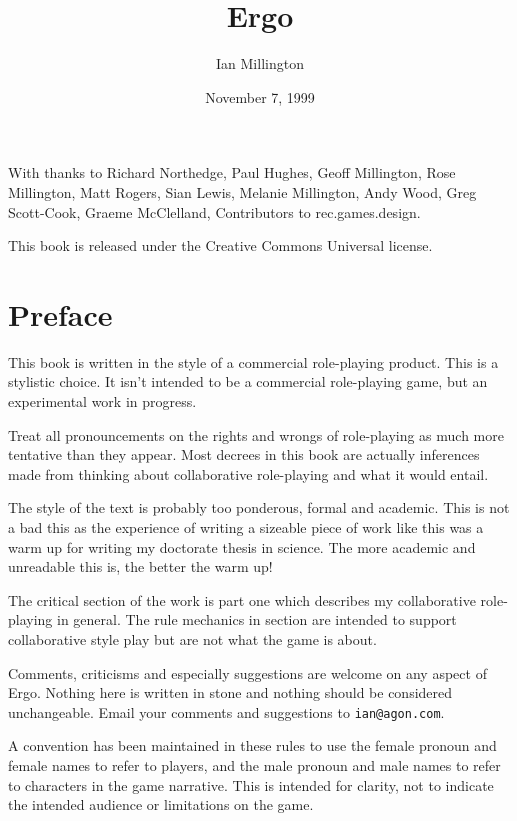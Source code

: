 \documentclass[twoside]{book}
\title{Ergo}
\author{Ian Millington}
\date{November 7, 1999}                                           %
\begin{document}
\maketitle


With thanks to Richard Northedge, Paul Hughes, Geoff
Millington, Rose Millington, Matt Rogers, Sian Lewis,
Melanie Millington, Andy Wood, Greg Scott-Cook, Graeme
McClelland, Contributors to rec.games.design.

This book is released under the Creative Commons Universal license.

\tableofcontents

\chapter{Preface}

This book is written in the style of a commercial role-playing product. This
is a stylistic choice. It isn't intended to be a commercial role-playing
game, but an experimental work in progress. 


Treat all pronouncements on the rights and wrongs of role-playing as much
more tentative than they appear. Most decrees in this book are actually
inferences made from thinking about collaborative role-playing and what it
would entail.

The style of the text is probably too ponderous, formal and
academic. This is not a bad this as the experience of writing a
sizeable piece of work like this was a warm up for writing my
doctorate thesis in science. The more academic and unreadable this is,
the better the warm up!

The critical section of the work is part one which describes my
collaborative role-playing in general. The rule mechanics in section
are intended to support collaborative style play but are not what the
game is about.

Comments, criticisms and especially suggestions are welcome on any
aspect of Ergo. Nothing here is written in stone and nothing should be
considered unchangeable. Email your comments and suggestions to
{\tt ian@agon.com}.

A convention has been maintained in these rules to use the female
pronoun and female names to refer to players, and the male pronoun and
male names to refer to characters in the game narrative. This is
intended for clarity, not to indicate the intended audience or
limitations on the game.
\end{document}
